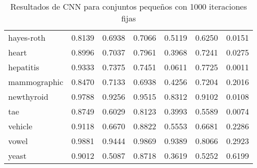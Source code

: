 \begin{table}[]
\begin{tabular}{l c c c c c c}
hayes-roth & 0.8139 & 0.6938 & 0.7066 & 0.5119 & 0.6250 & 0.0151 \\
heart & 0.8996 & 0.7037 & 0.7961 & 0.3968 & 0.7241 & 0.0275 \\
hepatitis & 0.9333 & 0.7375 & 0.7451 & 0.0611 & 0.7725 & 0.0011 \\
mammographic & 0.8470 & 0.7133 & 0.6938 & 0.4256 & 0.7204 & 0.2016 \\
newthyroid & 0.9788 & 0.9256 & 0.9515 & 0.8312 & 0.9102 & 0.0108 \\
tae & 0.8749 & 0.6029 & 0.8123 & 0.3993 & 0.5589 & 0.0074 \\
vehicle & 0.9118 & 0.6670 & 0.8822 & 0.5553 & 0.6681 & 0.2286 \\
vowel & 0.9881 & 0.9444 & 0.9869 & 0.9389 & 0.8066 & 0.2923 \\
yeast & 0.9012 & 0.5087 & 0.8718 & 0.3619 & 0.5252 & 0.6199 \\

\hline
\end{tabular}
\caption{Resultados de CNN para conjuntos pequeños con 1000 iteraciones fijas}
\label{res-peq-cnn}
\end{table}

